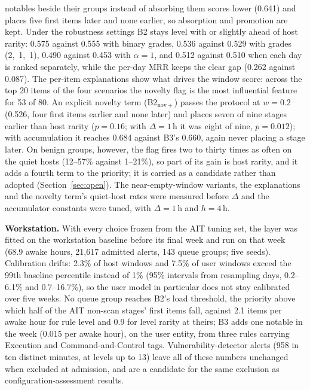\documentclass[conference]{IEEEtran}
\begin{document}
notables beside their groups instead of absorbing them scores lower (0.641) and places five first items later and none earlier, so absorption and promotion are kept. Under the robustness settings B2 stays level with or slightly ahead of host rarity: 0.575 against 0.555 with binary grades, 0.536 against 0.529 with grades (2,~1,~1), 0.490 against 0.453 with $\alpha = 1$, and 0.512 against 0.510 when each day is ranked separately, while the per-day MRR keeps the clear gap (0.262 against 0.087). The per-item explanations show what drives the window score: across the top 20 items of the four scenarios the novelty flag is the most influential feature for 53 of 80. An explicit novelty term (B2$_\mathrm{nov+}$) passes the protocol at $w = 0.2$ (0.526, four first items earlier and none later) and places seven of nine stages earlier than host rarity ($p = 0.16$; with $\Delta = 1$\,h it was eight of nine, $p = 0.012$); with accumulation it reaches 0.684 against B3's 0.660, again never placing a stage later. On benign groups, however, the flag fires two to thirty times as often on the quiet hosts (12--57\% against 1--21\%), so part of its gain is host rarity, and it adds a fourth term to the priority; it is carried as a candidate rather than adopted (Section~\ref{sec:open}). The near-empty-window variants, the explanations and the novelty term's quiet-host rates were measured before $\Delta$ and the accumulator constants were tuned, with $\Delta = 1$\,h and $h = 4$\,h.

\textbf{Workstation.} With every choice frozen from the AIT tuning set, the layer was fitted on the workstation baseline before its final week and run on that week (68.9 awake hours, 21{,}617 admitted alerts, 143 queue groups; five seeds). Calibration drifts: 2.3\% of host windows and 7.5\% of user windows exceed the 99th baseline percentile instead of 1\% (95\% intervals from resampling days, 0.2--6.1\% and 0.7--16.7\%), so the user model in particular does not stay calibrated over five weeks. No queue group reaches B2's load threshold, the priority above which half of the AIT non-scan stages' first items fall, against 2.1 items per awake hour for rule level and 0.9 for level rarity at theirs; B3 adds one notable in the week (0.015 per awake hour), on the user entity, from three rules carrying Execution and Command-and-Control tags. Vulnerability-detector alerts (958 in ten distinct minutes, at levels up to 13) leave all of these numbers unchanged when excluded at admission, and are a candidate for the same exclusion as configuration-assessment results.
\end{document}

